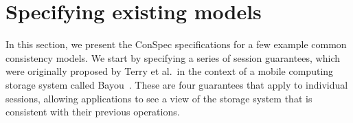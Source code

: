 \documentclass[journal, compsoc]{IEEEtran}
\begin{document}
	
	\section{Specifying existing models}\label{sec:list}
	In this section, we present the ConSpec specifications for a few example common
	consistency models. %
	 We start by specifying a series of session guarantees, which were originally proposed by Terry et al.\ in the context of a mobile computing storage system called Bayou~\cite{Terry:1994:SGW:645792.668302}. These are four guarantees that apply to individual sessions, allowing applications to see a view of the storage system that is consistent with their previous operations.
	
\end{document}
